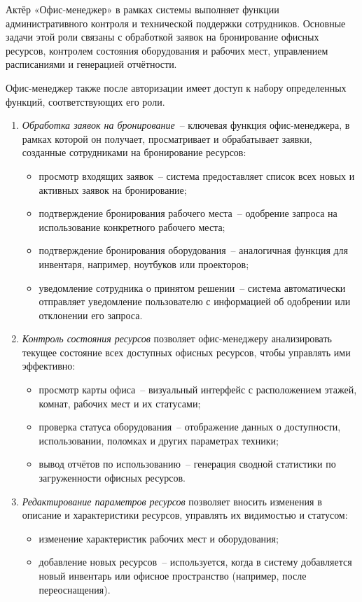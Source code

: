 Актёр «Офис-менеджер» в рамках системы выполняет функции административного контроля и технической поддержки сотрудников. Основные задачи этой роли связаны с обработкой заявок на бронирование офисных ресурсов, контролем состояния оборудования и рабочих мест, управлением расписаниями и генерацией отчётности.

Офис-менеджер также после авторизации имеет доступ к набору определенных функций, соответствующих его роли.

\begin{enumerate}
    \item \textit{Обработка заявок на бронирование}~-- ключевая функция офис-ме\-нед\-же\-ра, в рамках которой он получает, просматривает и обрабатывает заявки, созданные сотрудниками на бронирование ресурсов:
    \begin{itemize}
        \item просмотр входящих заявок~-- система предоставляет список всех новых и активных заявок на бронирование;
        \item подтверждение бронирования рабочего места~-- одобрение запроса на использование конкретного рабочего места;
        \item подтверждение бронирования оборудования~-- аналогичная функция для инвентаря, например, ноутбуков или проекторов;
        \item уведомление сотрудника о принятом решении~-- система автоматически отправляет уведомление пользователю с информацией об одобрении или отклонении его запроса.
    \end{itemize}
    
    \item \textit{Контроль состояния ресурсов} позволяет офис-менеджеру анализировать текущее состояние всех доступных офисных ресурсов, чтобы управлять ими эффективно:
    \begin{itemize}
        \item просмотр карты офиса~-- визуальный интерфейс с расположением этажей, комнат, рабочих мест и их статусами;
        \item проверка статуса оборудования~-- отображение данных о доступности, использовании, поломках и других параметрах техники;
        \item вывод отчётов по использованию~-- генерация сводной статистики по загруженности офисных ресурсов.
    \end{itemize}

    \item \textit{Редактирование параметров ресурсов} позволяет вносить изменения в описание и характеристики ресурсов, управлять их видимостью и статусом:
    \begin{itemize}
        \item изменение характеристик рабочих мест и оборудования;
        \item добавление новых ресурсов~-- используется, когда в систему добавляется новый инвентарь или офисное пространство (например, после переоснащения).
    \end{itemize}


\end{enumerate}
